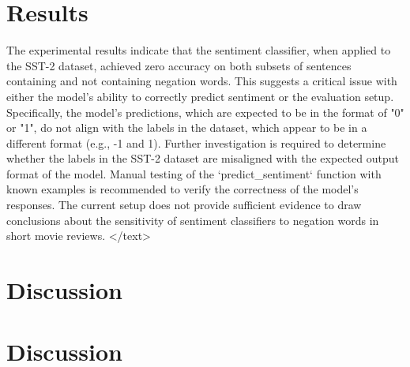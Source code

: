 \documentclass{article}
\begin{document}
\section{Results}
The experimental results indicate that the sentiment classifier, when applied to the SST-2 dataset, achieved zero accuracy on both subsets of sentences containing and not containing negation words. This suggests a critical issue with either the model's ability to correctly predict sentiment or the evaluation setup. Specifically, the model's predictions, which are expected to be in the format of "0" or "1", do not align with the labels in the dataset, which appear to be in a different format (e.g., -1 and 1). Further investigation is required to determine whether the labels in the SST-2 dataset are misaligned with the expected output format of the model. Manual testing of the `predict_sentiment` function with known examples is recommended to verify the correctness of the model's responses. The current setup does not provide sufficient evidence to draw conclusions about the sensitivity of sentiment classifiers to negation words in short movie reviews.
</text>
\section{Discussion}
\section{Discussion}
\end{document}
